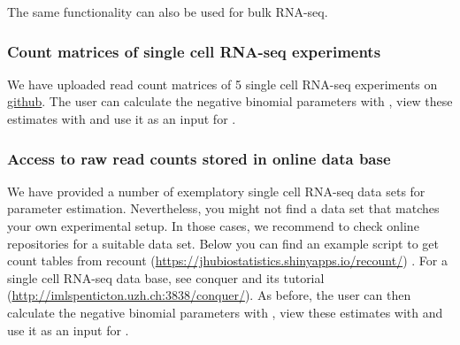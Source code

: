 \documentclass{article}\usepackage[]{graphicx}\usepackage[usenames,dvipsnames]{color}
\begin{document}
The same functionality can also be used for bulk RNA-seq.

\subsubsection{Count matrices of single cell RNA-seq experiments}

We have uploaded read count matrices of 5 single cell RNA-seq experiments on \href{https://github.com/bvieth/powsimRData}{github}.
The user can calculate the negative binomial parameters with , view these estimates with  and use it as an input for .

\subsubsection{Access to raw read counts stored in online data base}

We have provided a number of exemplatory single cell RNA-seq data sets for parameter estimation. Nevertheless, you might not find a data set that matches your own experimental setup. In those cases, we recommend to check online repositories for a suitable data set. Below you can find an example script to get count tables from recount (\url{https://jhubiostatistics.shinyapps.io/recount/}) \cite{Collado-Torres2017-mo}. For a single cell RNA-seq data base, see conquer and its tutorial (\url{http://imlspenticton.uzh.ch:3838/conquer/}).
As before, the user can then calculate the negative binomial parameters with , view these estimates with  and use it as an input for .
\end{document}
